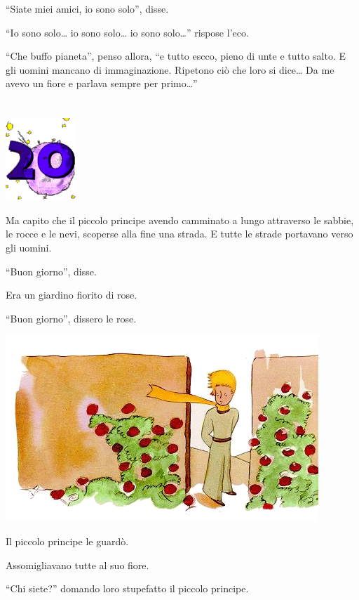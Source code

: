 \documentclass[11pt]{scrbook}
\begin{document}
``Siate miei amici, io sono solo'', disse.

``Io sono solo\ldots{} io sono solo\ldots{} io sono solo\ldots{}''
rispose l'eco.

``Che buffo pianeta'', penso allora, ``e tutto escco, pieno di unte e
tutto salto. E gli uomini mancano di immaginazione. Ripetono ciò che
loro si dice\ldots{} Da me avevo un fiore e parlava sempre per
primo\ldots{}''

\chapter{}
\begin{center}
\includegraphics{img/chapter20}
\end{center}

Ma capito che il piccolo principe avendo camminato a lungo attraverso le
sabbie, le rocce e le nevi, scoperse alla fine una strada. E tutte le
strade portavano verso gli uomini.

``Buon giorno'', disse.

Era un giardino fiorito di rose.

``Buon giorno'', dissero le rose.

\begin{center}
\includegraphics{img/20a}
\end{center}

Il piccolo principe le guardò.

Assomigliavano tutte al suo fiore.

``Chi siete?'' domando loro stupefatto il piccolo principe.
\end{document}
